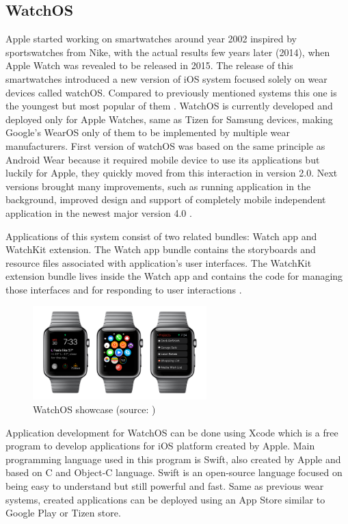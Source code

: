 \subsection{WatchOS}\label{sec:WatchOS}
Apple started working on smartwatches around year 2002 inspired by sportswatches from Nike, with the actual results few years later (2014), when Apple Watch was revealed to be released in 2015. The release of this smartwatches introduced a new version of iOS system focused solely on wear devices called watchOS. Compared to previously mentioned systems this one is the youngest but most popular of them \cite{ATOHAWWC}. WatchOS is currently developed and deployed only for Apple Watches, same as Tizen for Samsung devices, making Google's WearOS only of them to be implemented by multiple wear manufacturers. First version of watchOS was based on the same principle as Android Wear because it required mobile device to use its applications but luckily for Apple, they quickly moved from this interaction in version 2.0. Next versions brought many improvements, such as running application in the background, improved design and support of completely mobile independent application in the newest major version 4.0 \cite{WOS9To5MAC}.

Applications of this system consist of two related bundles: Watch app and WatchKit extension. The Watch app bundle contains the storyboards and resource files associated with application's user interfaces. The WatchKit extension bundle lives inside the Watch app and contains the code for managing those interfaces and for responding to user interactions \cite{AppleDev}.

\begin{figure}[H]
	\begin{centering}
		\includegraphics[width=0.6\textwidth]{img/apple_watchOs}
		\par\end{centering}
	\caption{WatchOS showcase (source: \cite{HTFAIAAW})\label{fig:WatchOS}}
	\label{fig06c04}
\end{figure}

Application development for WatchOS can be done using Xcode which is a free program to develop applications for iOS platform created by Apple. Main programming language used in this program is Swift, also created by Apple and based on C and Object-C language. Swift is an open-source language focused on being easy to understand but still powerful and fast. Same as previous wear systems, created applications can be deployed using an App Store similar to Google Play or Tizen store.